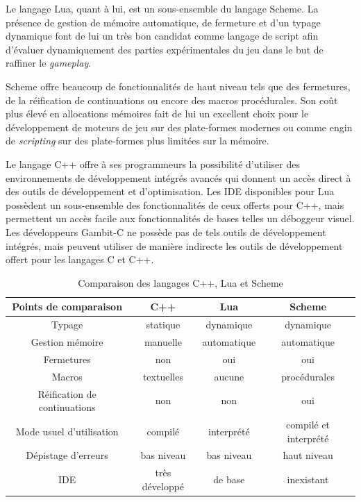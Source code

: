 \documentclass[12pt,twoside,letterpaper,francais]{book}
\newcommand{\customizedTableName}{\textsc{Tableau}}
\begin{document}
Le langage Lua, quant à lui, est un sous-ensemble du langage
Scheme. La présence de gestion de mémoire automatique, de fermeture et
d'un typage dynamique font de lui un très bon candidat comme langage
de script afin d'évaluer dynamiquement des parties expérimentales du
jeu dans le but de raffiner le \textit{gameplay}.

Scheme offre beaucoup de fonctionnalités de haut niveau tels que des
fermetures, de la réification de continuations ou encore des macros
procédurales. Son coût plus élevé en allocations mémoires fait de lui
un excellent choix pour le dévelop\-pement de moteurs de jeu sur des
plate-formes modernes ou comme engin de \textit{scripting} sur des
plate-formes plus limitées sur la mémoire.

Le langage C++ offre à ses programmeurs la possibilité d'utiliser des
environnements de développement intégrés avancés qui donnent un accès
direct à des outils de développement et d'optimisation. Les IDE
disponibles pour Lua possèdent un sous-ensemble des fonctionnalités de
ceux offerts pour C++, mais permettent un accès facile aux
fonctionnalités de bases telles un déboggeur visuel. Les développeurs
Gambit-C ne possède pas de tels outils de développement intégrés, mais
peuvent utiliser de manière indirecte les outils de développement
offert pour les langages C et C++.

\renewcommand{\tablename}{\customizedTableName}
\begin{table}
  \begin{tabular}{cccc}
    Points de comparaison         & C++ & Lua & Scheme\\
    \hline \hline
    Typage                       & statique & dynamique & dynamique\\
    Gestion mémoire              & manuelle & automatique & automatique\\
    Fermetures                   & non & oui & oui\\
    Macros                       & textuelles & aucune & procédurales\\
    Réification de continuations & non & non & oui\\
    Mode usuel d'utilisation     & compilé & interprété & compilé et interprété\\
    Dépistage d'erreurs          & bas niveau & bas niveau & haut niveau\\
    IDE                          & très développé & de base & inexistant\\
\hline
  \end{tabular}
  \caption{Comparaison des langages C++, Lua et Scheme}
  \label{Rev:lang-comp}
\end{table}
\end{document}
